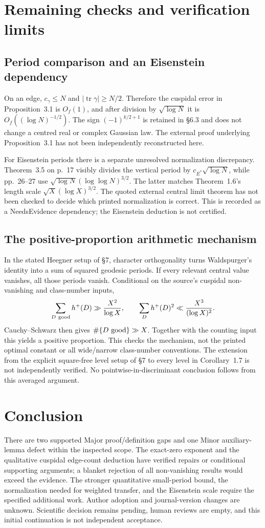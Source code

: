 \documentclass[10pt]{article}
\begin{document}
\section*{Remaining checks and verification limits}
\subsection*{Period comparison and an Eisenstein dependency}
On an edge, \(c_\gamma\le N\) and \(|\operatorname{tr}\gamma|\ge N/2\). Therefore the cuspidal error in Proposition 3.1 is \(O_f(1)\), and after division by \(\sqrt{\log N}\) it is \(O_f((\log N)^{-1/2})\). The sign \((-1)^{k/2+1}\) is retained in §6.3 and does not change a centred real or complex Gaussian law. The external proof underlying Proposition 3.1 has not been independently reconstructed here.\par
For Eisenstein periods there is a separate unresolved normalization discrepancy. Theorem 3.5 on p. 17 visibly divides the vertical period by \(c_{E^*}\sqrt{\log N}\), while pp. 26–27 use \(\sqrt{\log N}(\log\log N)^{3/2}\). The latter matches Theorem 1.6’s length scale \(\sqrt X(\log X)^{3/2}\). The quoted external central limit theorem has not been checked to decide which printed normalization is correct. This is recorded as a NeedsEvidence dependency; the Eisenstein deduction is not certified.\par
\subsection*{The positive-proportion arithmetic mechanism}
In the stated Heegner setup of §7, character orthogonality turns Waldspurger’s identity into a sum of squared geodesic periods. If every relevant central value vanishes, all those periods vanish. Conditional on the source’s cuspidal non-vanishing and class-number inputs, \[\sum_{D\ {\rm good}}h^+(D)\gg \frac{X^2}{\log X},
 \qquad
 \sum_D h^+(D)^2\ll \frac{X^3}{(\log X)^2}.\] Cauchy–Schwarz then gives \(\#\{D\ {\rm good}\}\gg X\). Together with the counting input this yields a positive proportion. This checks the mechanism, not the printed optimal constant or all wide/narrow class-number conventions. The extension from the explicit square-free level setup of §7 to every level in Corollary 1.7 is not independently verified. No pointwise-in-discriminant conclusion follows from this averaged argument.\par
\section*{Conclusion}
There are two supported Major proof/definition gaps and one Minor auxiliary-lemma defect within the inspected scope. The exact-zero exponent and the qualitative cuspidal edge-count deduction have verified repairs or conditional supporting arguments; a blanket rejection of all non-vanishing results would exceed the evidence. The stronger quantitative small-period bound, the normalization needed for weighted transfer, and the Eisenstein scale require the specified additional work. Author adoption and journal-version changes are unknown. Scientific decision remains pending, human reviews are empty, and this initial continuation is not independent acceptance.\par
\end{document}
